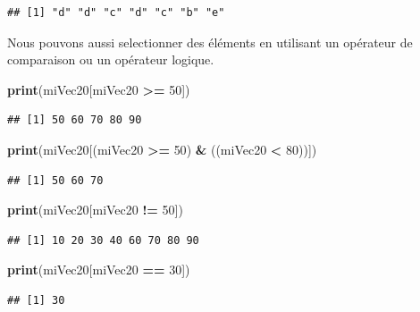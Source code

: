 \documentclass[]{book}
\newenvironment{Shaded}{\begin{snugshade}}{\end{snugshade}}
\newcommand{\KeywordTok}[1]{\textcolor[rgb]{0.13,0.29,0.53}{\textbf{#1}}}
\newcommand{\DecValTok}[1]{\textcolor[rgb]{0.00,0.00,0.81}{#1}}
\newcommand{\StringTok}[1]{\textcolor[rgb]{0.31,0.60,0.02}{#1}}
\newcommand{\OperatorTok}[1]{\textcolor[rgb]{0.81,0.36,0.00}{\textbf{#1}}}
\newcommand{\NormalTok}[1]{#1}
\begin{document}
\begin{verbatim}
## [1] "d" "d" "c" "d" "c" "b" "e"
\end{verbatim}

Nous pouvons aussi selectionner des éléments en utilisant un opérateur
de comparaison ou un opérateur logique.

\begin{Shaded}
\begin{Highlighting}[]
\KeywordTok{print}\NormalTok{(miVec20[miVec20 }\OperatorTok{>=}\StringTok{ }\DecValTok{50}\NormalTok{])}
\end{Highlighting}
\end{Shaded}

\begin{verbatim}
## [1] 50 60 70 80 90
\end{verbatim}

\begin{Shaded}
\begin{Highlighting}[]
\KeywordTok{print}\NormalTok{(miVec20[(miVec20 }\OperatorTok{>=}\StringTok{ }\DecValTok{50}\NormalTok{) }\OperatorTok{&}\StringTok{ }\NormalTok{((miVec20 }\OperatorTok{<}\StringTok{ }\DecValTok{80}\NormalTok{))])}
\end{Highlighting}
\end{Shaded}

\begin{verbatim}
## [1] 50 60 70
\end{verbatim}

\begin{Shaded}
\begin{Highlighting}[]
\KeywordTok{print}\NormalTok{(miVec20[miVec20 }\OperatorTok{!=}\StringTok{ }\DecValTok{50}\NormalTok{])}
\end{Highlighting}
\end{Shaded}

\begin{verbatim}
## [1] 10 20 30 40 60 70 80 90
\end{verbatim}

\begin{Shaded}
\begin{Highlighting}[]
\KeywordTok{print}\NormalTok{(miVec20[miVec20 }\OperatorTok{==}\StringTok{ }\DecValTok{30}\NormalTok{])}
\end{Highlighting}
\end{Shaded}

\begin{verbatim}
## [1] 30
\end{verbatim}
\end{document}
